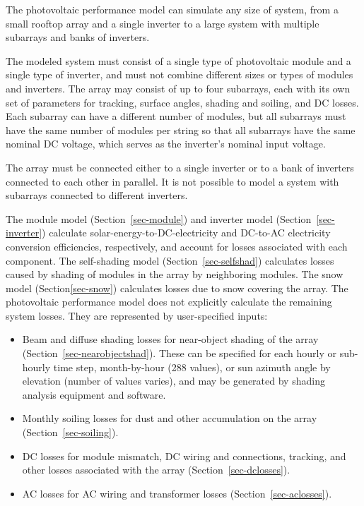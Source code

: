 \documentclass[12pt,letterpaper]{article}
\begin{document}
The photovoltaic performance model can simulate any size of system, from a small rooftop array and a single inverter to a large system with multiple subarrays and banks of inverters.

The modeled system must consist of a single type of photovoltaic module and a single type of inverter, and must not combine different sizes or types of modules and inverters. The array may consist of up to four subarrays, each with its own set of parameters for tracking, surface angles, shading and soiling, and DC losses. Each subarray can have a different number of modules, but all subarrays must have the same number of modules per string so that all subarrays have the same nominal DC voltage, which serves as the inverter's nominal input voltage.

The array must be connected either to a single inverter or to a bank of inverters connected to each other in parallel. It is not possible to model a system with subarrays connected to different inverters.

The module model (Section~\ref{sec-module}) and inverter model (Section~\ref{sec-inverter}) calculate solar-energy-to-DC-electricity and DC-to-AC electricity conversion efficiencies, respectively, and account for losses associated with each component. The self-shading model (Section~\ref{sec-selfshad}) calculates losses caused by shading of modules in the array by neighboring modules. The snow model (Section\ref{sec-snow}) calculates losses due to snow covering the array. The photovoltaic performance model does not explicitly calculate the remaining system losses. They are represented by user-specified inputs:

\begin{itemize}
\item{Beam and diffuse shading losses for near-object shading of the array (Section~\ref{sec-nearobjectshad}). These can be specified for each hourly or sub-hourly time step, month-by-hour (288 values), or sun azimuth angle by elevation (number of values varies), and may be generated by shading analysis equipment and software.}
\item{Monthly soiling losses for dust and other accumulation on the array (Section~\ref{sec-soiling}).}
\item{DC losses for module mismatch, DC wiring and connections, tracking, and other losses associated with the array (Section~\ref{sec-dclosses}).}
\item{AC losses for AC wiring and transformer losses (Section~\ref{sec-aclosses}).}
\end{itemize}
\end{document}
